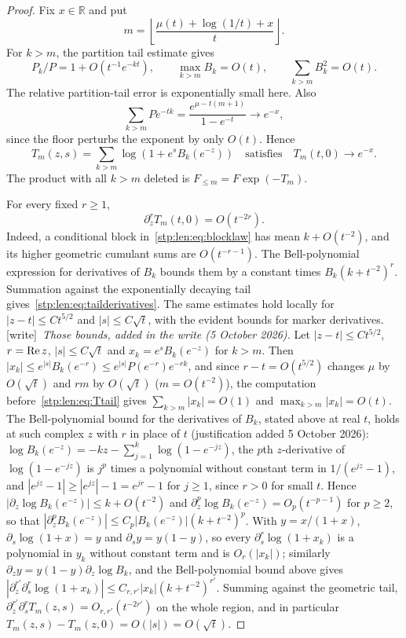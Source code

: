 \documentclass[11pt]{article}
\theoremstyle{remark}\newtheorem{remark}[theorem]{Remark}
\newcommand{\wtag}{\textup{[write]}}
\begin{document}
\begin{proof}
Fix $x\in\mathbb R$ and put
\[
 m=\left\lfloor\frac{\mu(t)+\log(1/t)+x}{t}\right\rfloor.
\]
For $k>m$, the partition tail estimate gives
\[
 P_k/P=1+O(t^{-1}e^{-kt}),\qquad
 \max_{k>m}B_k=O(t),\qquad \sum_{k>m}B_k^2=O(t).
\]
The relative partition-tail error is exponentially small here. Also
\[
 \sum_{k>m}Pe^{-tk}
 =\frac{e^{\mu-t(m+1)}}{1-e^{-t}}\longrightarrow e^{-x},
\]
since the floor perturbs the exponent by only $O(t)$. Hence
\begin{equation}\label{stp:len:eq:Ttail}
 T_m(z,s)=\sum_{k>m}\log(1+e^sB_k(e^{-z}))
 \quad\text{satisfies}\quad T_m(t,0)\longrightarrow e^{-x}.
\end{equation}
The product with all $k>m$ deleted is $F_{\le m}=F\exp(-T_m)$.

For every fixed $r\ge1$,
\begin{equation}\label{stp:len:eq:tailderivatives}
 \partial_z^rT_m(t,0)=O(t^{-2r}).
\end{equation}
Indeed, a conditional block in~\eqref{stp:len:eq:blocklaw} has mean $k+O(t^{-2})$, and its higher geometric cumulant sums are $O(t^{-r-1})$. The Bell-polynomial expression for derivatives of $B_k$ bounds them by a constant times $B_k(k+t^{-2})^r$. Summation against the exponentially decaying tail gives~\eqref{stp:len:eq:tailderivatives}. The same estimates hold locally for $|z-t|\le Ct^{5/2}$ and $|s|\le C\sqrt t$, with the evident bounds for marker derivatives. \wtag\ \emph{Those bounds, added in the write (5 October 2026).} Let
$|z-t|\le Ct^{5/2}$, $r=\operatorname{Re} z$, $|s|\le C\sqrt t$ and $x_k=e^sB_k(e^{-z})$
for $k>m$. Then $|x_k|\le e^{|s|}B_k(e^{-r})\le e^{|s|}P(e^{-r})e^{-rk}$, and
since $r-t=O(t^{5/2})$ changes $\mu$ by $O(\sqrt t)$ and $rm$ by $O(\sqrt t)$
($m=O(t^{-2})$), the computation before~\eqref{stp:len:eq:Ttail} gives
$\sum_{k>m}|x_k|=O(1)$ and $\max_{k>m}|x_k|=O(t)$. The Bell-polynomial
bound for the derivatives of $B_k$, stated above at real $t$, holds at such
complex $z$ with $r$ in place of $t$ (justification added 5 October 2026):
$\log B_k(e^{-z})=-kz-\sum_{j=1}^k\log(1-e^{-jz})$, the $p$th $z$-derivative
of $\log(1-e^{-jz})$ is $j^p$ times a polynomial without constant term in
$1/(e^{jz}-1)$, and $|e^{jz}-1|\ge|e^{jz}|-1=e^{jr}-1$ for $j\ge1$, since
$r>0$ for small $t$. Hence $|\partial_z\log B_k(e^{-z})|\le k+O(t^{-2})$ and
$\partial_z^p\log B_k(e^{-z})=O_p(t^{-p-1})$ for $p\ge2$, so that
$|\partial_z^pB_k(e^{-z})|\le C_p|B_k(e^{-z})|(k+t^{-2})^p$. With $y=x/(1+x)$,
$\partial_s\log(1+x)=y$ and $\partial_sy=y(1-y)$, so every
$\partial_s^r\log(1+x_k)$ is a polynomial in $y_k$ without constant term and
is $O_r(|x_k|)$; similarly $\partial_zy=y(1-y)\partial_z\log B_k$, and the
Bell-polynomial bound above gives
$|\partial_z^{r'}\partial_s^r\log(1+x_k)|\le C_{r,r'}|x_k|(k+t^{-2})^{r'}$.
Summing against the geometric tail,
$\partial_z^{r'}\partial_s^rT_m(z,s)=O_{r,r'}(t^{-2r'})$ on the whole region,
and in particular $T_m(z,s)-T_m(z,0)=O(|s|)=O(\sqrt t)$.


\end{proof}
\end{document}
